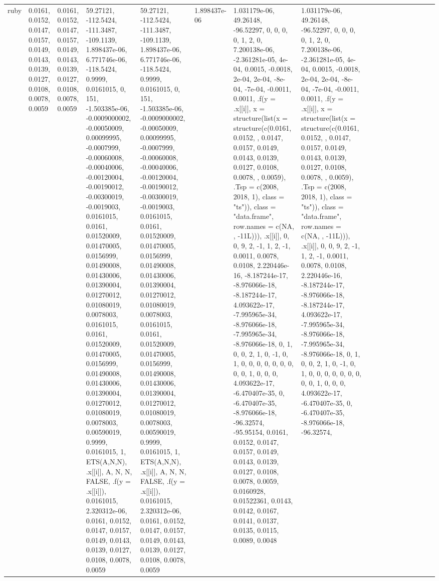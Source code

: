 \documentclass[
]{article}
\begin{document}
\begin{table}
\begin{tabular}{l|l|l|l|l|l|l|l|l|l|l|r|l|r|r|r|r|r}
\hline
ruby & 0.0161, 0.0152, 0.0147, 0.0157, 0.0149, 0.0143, 0.0139, 0.0127, 0.0108, 0.0078, 0.0059 & 0.0161, 0.0152, 0.0147, 0.0157, 0.0149, 0.0143, 0.0139, 0.0127, 0.0108, 0.0078, 0.0059 & 59.27121, -112.5424, -111.3487, -109.1139, 1.898437e-06, 6.771746e-06, -118.5424, 0.9999, 0.0161015, 0, 151, -1.503385e-06, -0.0009000002, -0.00050009, 0.00099995, -0.0007999, -0.00060008, -0.00040006, -0.00120004, -0.00190012, -0.00300019, -0.0019003, 0.0161015, 0.0161, 0.01520009, 0.01470005, 0.0156999, 0.01490008, 0.01430006, 0.01390004, 0.01270012, 0.01080019, 0.0078003, 0.0161015, 0.0161, 0.01520009, 0.01470005, 0.0156999, 0.01490008, 0.01430006, 0.01390004, 0.01270012, 0.01080019, 0.0078003, 0.00590019, 0.9999, 0.0161015, 1, ETS(A,N,N), .x[[i]], A, N, N, FALSE, .f(y = .x[[i]]), 0.0161015, 2.320312e-06, 0.0161, 0.0152, 0.0147, 0.0157, 0.0149, 0.0143, 0.0139, 0.0127, 0.0108, 0.0078, 0.0059 & 59.27121, -112.5424, -111.3487, -109.1139, 1.898437e-06, 6.771746e-06, -118.5424, 0.9999, 0.0161015, 0, 151, -1.503385e-06, -0.0009000002, -0.00050009, 0.00099995, -0.0007999, -0.00060008, -0.00040006, -0.00120004, -0.00190012, -0.00300019, -0.0019003, 0.0161015, 0.0161, 0.01520009, 0.01470005, 0.0156999, 0.01490008, 0.01430006, 0.01390004, 0.01270012, 0.01080019, 0.0078003, 0.0161015, 0.0161, 0.01520009, 0.01470005, 0.0156999, 0.01490008, 0.01430006, 0.01390004, 0.01270012, 0.01080019, 0.0078003, 0.00590019, 0.9999, 0.0161015, 1, ETS(A,N,N), .x[[i]], A, N, N, FALSE, .f(y = .x[[i]]), 0.0161015, 2.320312e-06, 0.0161, 0.0152, 0.0147, 0.0157, 0.0149, 0.0143, 0.0139, 0.0127, 0.0108, 0.0078, 0.0059 & 1.898437e-06 & 1.031179e-06, 49.26148, -96.52297, 0, 0, 0, 0, 1, 2, 0, 7.200138e-06, -2.361281e-05, 4e-04, 0.0015, -0.0018, 2e-04, 2e-04, -8e-04, -7e-04, -0.0011, 0.0011, .f(y = .x[[i]], x = structure(list(x = structure(c(0.0161, 0.0152, , 0.0147, 0.0157, 0.0149, 0.0143, 0.0139, 0.0127, 0.0108, 0.0078, , 0.0059), .Tsp = c(2008, 2018, 1), class = "ts")), class = "data.frame", row.names = c(NA, , -11L))), .x[[i]], 0, 0, 9, 2, -1, 1, 2, -1, 0.0011, 0.0078, 0.0108, 2.220446e-16, -8.187244e-17, -8.976066e-18, -8.187244e-17, 4.093622e-17, -7.995965e-34, -8.976066e-18, -7.995965e-34, -8.976066e-18, 0, 1, 0, 0, 2, 1, 0, -1, 0, 1, 0, 0, 0, 0, 0, 0, 0, 0, 0, 1, 0, 0, 0, 4.093622e-17, -6.470407e-35, 0, -6.470407e-35, -8.976066e-18, -96.32574, -95.95154, 0.0161, 0.0152, 0.0147, 0.0157, 0.0149, 0.0143, 0.0139, 0.0127, 0.0108, 0.0078, 0.0059, 0.0160928, 0.01522361, 0.0143, 0.0142, 0.0167, 0.0141, 0.0137, 0.0135, 0.0115, 0.0089, 0.0048 & 1.031179e-06, 49.26148, -96.52297, 0, 0, 0, 0, 1, 2, 0, 7.200138e-06, -2.361281e-05, 4e-04, 0.0015, -0.0018, 2e-04, 2e-04, -8e-04, -7e-04, -0.0011, 0.0011, .f(y = .x[[i]], x = structure(list(x = structure(c(0.0161, 0.0152, , 0.0147, 0.0157, 0.0149, 0.0143, 0.0139, 0.0127, 0.0108, 0.0078, , 0.0059), .Tsp = c(2008, 2018, 1), class = "ts")), class = "data.frame", row.names = c(NA, , -11L))), .x[[i]], 0, 0, 9, 2, -1, 1, 2, -1, 0.0011, 0.0078, 0.0108, 2.220446e-16, -8.187244e-17, -8.976066e-18, -8.187244e-17, 4.093622e-17, -7.995965e-34, -8.976066e-18, -7.995965e-34, -8.976066e-18, 0, 1, 0, 0, 2, 1, 0, -1, 0, 1, 0, 0, 0, 0, 0, 0, 0, 0, 0, 1, 0, 0, 0, 4.093622e-17, -6.470407e-35, 0, -6.470407e-35, -8.976066e-18, -96.32574, 
\end{tabular}
\end{table}
\end{document}
